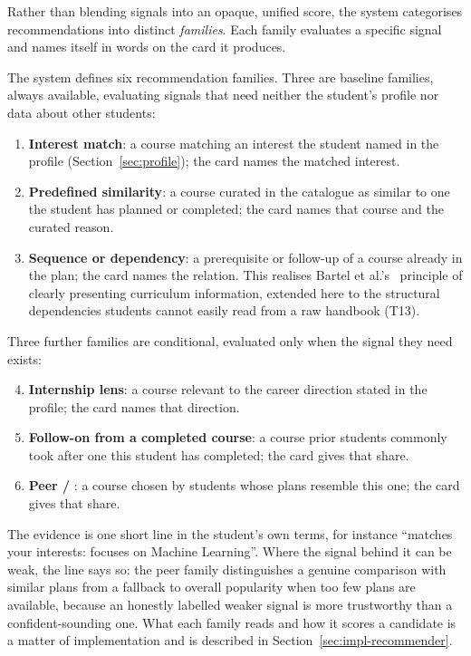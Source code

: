 Rather than blending signals into an opaque, unified score, the system categorises recommendations into distinct \emph{families}. Each family evaluates a specific signal and names itself in words on the card it produces.

The system defines six recommendation families. Three are baseline families, always available, evaluating signals that need neither the student's profile nor data about other students:
\begin{enumerate}
  \item \textbf{Interest match}: a course matching an interest the student named in the profile (Section~\ref{sec:profile}); the card names the matched interest.
  \item \textbf{Predefined similarity}: a course curated in the catalogue as similar to one the student has planned or completed; the card names that course and the curated reason.
  \item \textbf{Sequence or dependency}: a prerequisite or follow-up of a course already in the plan; the card names the relation. This realises Bartel et al.'s~\cite{bartel_design_2024} principle of clearly presenting curriculum information, extended here to the structural dependencies students cannot easily read from a raw handbook (T13).
\end{enumerate}

Three further families are conditional, evaluated only when the signal they need exists:
\begin{enumerate}
  \setcounter{enumi}{3}
  \item \textbf{Internship lens}: a course relevant to the career direction stated in the profile; the card names that direction.
  \item \textbf{Follow-on from a completed course}: a course prior students commonly took after one this student has completed; the card gives that share.
  \item \textbf{Peer / }: a course chosen by students whose plans resemble this one; the card gives that share.
\end{enumerate}

The evidence is one short line in the student's own terms, for instance \enquote{matches your interests: focuses on Machine Learning}. Where the signal behind it can be weak, the line says so: the peer family distinguishes a genuine comparison with similar plans from a fallback to overall popularity when too few plans are available, because an honestly labelled weaker signal is more trustworthy than a confident-sounding one. What each family reads and how it scores a candidate is a matter of implementation and is described in Section~\ref{sec:impl-recommender}.

